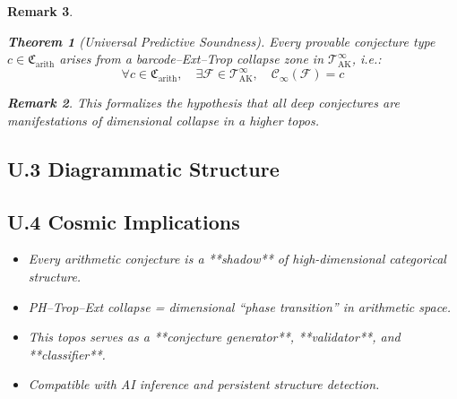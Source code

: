 \documentclass[11pt]{article}
\newtheorem{theorem}{Theorem}[section]
\newtheorem{remark}[theorem]{Remark}
\begin{document}
\begin{remark}
\begin{theorem}[Universal Predictive Soundness]
Every provable conjecture type \( c \in \mathfrak{C}_{\mathrm{arith}} \) arises from a barcode–Ext–Trop collapse zone in \( \mathscr{T}_{\mathrm{AK}}^{\infty} \),  
i.e.:
\[
\forall c \in \mathfrak{C}_{\mathrm{arith}}, \quad \exists \mathcal{F} \in \mathscr{T}_{\mathrm{AK}}^{\infty}, \quad
\mathscr{C}_\infty(\mathcal{F}) = c
\]
\end{theorem}

\begin{remark}
This formalizes the hypothesis that all deep conjectures are manifestations of dimensional collapse in a higher topos.
\end{remark}

\subsection*{U.3 Diagrammatic Structure}

\vspace{1em}
\begin{center}
\end{center}
\vspace{1em}

\subsection*{U.4 Cosmic Implications}

\begin{itemize}
  \item Every arithmetic conjecture is a **shadow** of high-dimensional categorical structure.
  \item PH–Trop–Ext collapse = dimensional “phase transition” in arithmetic space.
  \item This topos serves as a **conjecture generator**, **validator**, and **classifier**.
  \item Compatible with AI inference and persistent structure detection.
\end{itemize}


\end{remark}
\end{document}
